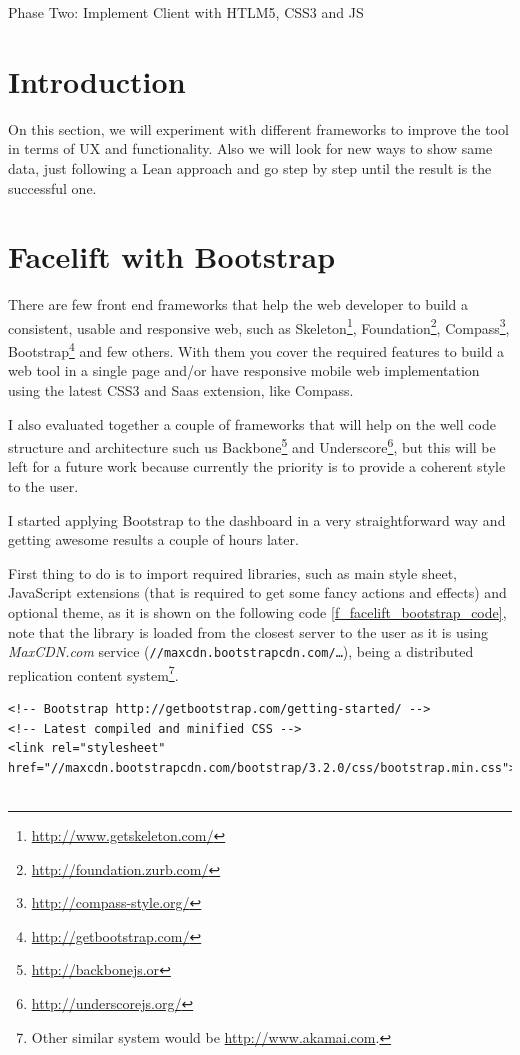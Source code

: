 \begin{part}{Phase Two: Implement Client with HTLM5, CSS3 and JS}

\chapter*{Introduction}
\label{c_phasetwo}
On this section, we will experiment with different frameworks to improve the
tool in terms of UX and functionality. Also we will look for new ways to show
same data, just following a Lean approach and go step by step until the result
is the successful one.


\chapter{Facelift with Bootstrap}
There are few front end frameworks that help the web developer to build a
consistent, usable and responsive web, such as
Skeleton\footnote{\url{http://www.getskeleton.com/}},
Foundation\footnote{\url{http://foundation.zurb.com/}},
Compass\footnote{\url{http://compass-style.org/}},
Bootstrap\footnote{\url{http://getbootstrap.com/}} and few others. With them
you cover the required features to build a web tool in a
single page and/or have responsive mobile web implementation using the latest
CSS3 and Saas extension, like Compass.

I also evaluated together a couple of frameworks that will help on the well code
structure and architecture such us Backbone\footnote{\url{http://backbonejs.or}}
and Underscore\footnote{\url{http://underscorejs.org/}}, but this will be left
for a future work because currently the priority is to provide a coherent style
to the user.

I started applying Bootstrap to the dashboard in a very straightforward way and
getting awesome results a couple of hours later.

First thing to do is to import required libraries, such as main style sheet,
JavaScript extensions (that is required to get some fancy actions and effects)
and optional theme, as it is shown on the following code
\ref{f_facelift_bootstrap_code}, note that the library is loaded from the
closest server to the user as it is using \emph{MaxCDN.com} service
(\texttt{//maxcdn.bootstrapcdn.com/\ldots}), being a distributed replication
content system\footnote{Other similar system would be
\url{http://www.akamai.com}.}.

\begin{lstlisting}[style=html,breaklines=true,caption=Bootstrap\
required\ libraries,label=f_facelift_bootstrap_code]
<!-- Bootstrap http://getbootstrap.com/getting-started/ --> 
<!-- Latest compiled and minified CSS --> 
<link rel="stylesheet" href="//maxcdn.bootstrapcdn.com/bootstrap/3.2.0/css/bootstrap.min.css">


\end{lstlisting}
\end{part}
